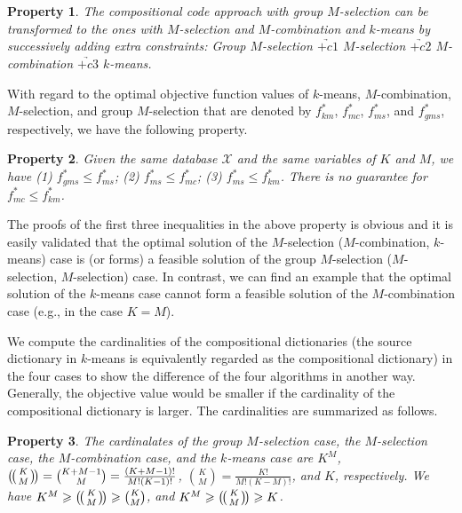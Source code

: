 \documentclass[10pt, letterpaper]{article}
\newtheorem{Property}{Property}
\begin{document}
\begin{Property}
\label{property:relationsofformulations}
The compositional code approach with group $M$-selection
can be transformed
to the ones with $M$-selection
and $M$-combination
and $k$-means
by successively adding extra constraints:
Group $M$-selection
 $\underrightarrow{+c1}$
$M$-selection $\underrightarrow{+c2}$
$M$-combination $\underrightarrow{+c3}$
$k$-means.
\end{Property}

With regard to the optimal objective function values of
$k$-means,
$M$-combination,
$M$-selection,
and group $M$-selection
that are denoted by
$f^*_{km}$,
$f^*_{mc}$,
$f^*_{ms}$,
and
$f^*_{gms}$,
respectively,
we have the following property.


\begin{Property}
\label{property:relationsofobjectivevalues}
Given the same database $\mathcal{X}$
and the same variables of $K$ and $M$,
we have
(1) $f^*_{gms} \leqslant f^*_{ms}$;
(2) $f^*_{ms} \leqslant  f^*_{mc}$;
(3) $f^*_{ms} \leqslant  f^*_{km}$.
There is no guarantee
for $f^*_{mc} \leqslant  f^*_{km}$.
\end{Property}

The proofs of the first three inequalities
in the above property is obvious
and it is easily validated
that the optimal solution of the $M$-selection ($M$-combination, $k$-means) case
is (or forms) a feasible solution of the group $M$-selection ($M$-selection, $M$-selection) case.
In contrast,
we can find an example
that the optimal solution of the $k$-means case
cannot form a feasible solution of the $M$-combination case (e.g., in the case $K=M$).


We compute
the cardinalities of the compositional dictionaries
(the source dictionary in $k$-means
is equivalently regarded as the compositional dictionary)
in the four cases
to show the difference of the four algorithms in another way.
Generally,
the objective value would be smaller
if the cardinality of the compositional dictionary is larger.
The cardinalities are summarized as follows.



\newcommand{\multibinom}[2]{
  \big(\!\big(\genfrac{}{}{0pt}{}{#1}{#2}\big)\!\big)
}


\begin{Property}
\label{property:cardinalities}
The cardinalates of the group $M$-selection case,
the $M$-selection case,
the $M$-combination case,
and the $k$-means case
are $K^M$,
$\multibinom{K}{M} = \binom{K+M-1}{M}
=\frac{(K+M-1)!}{M!(K-1)!}$,
$\binom{K}{M} = \frac{K!}{M!(K-M)!}$,
and $K$,
respectively.
We have
$K^M \geqslant \multibinom{K}{M} \geqslant
\binom{K}{M}$,
and
$K^M \geqslant \multibinom{K}{M} \geqslant
K$.
\end{Property}
\end{document}
